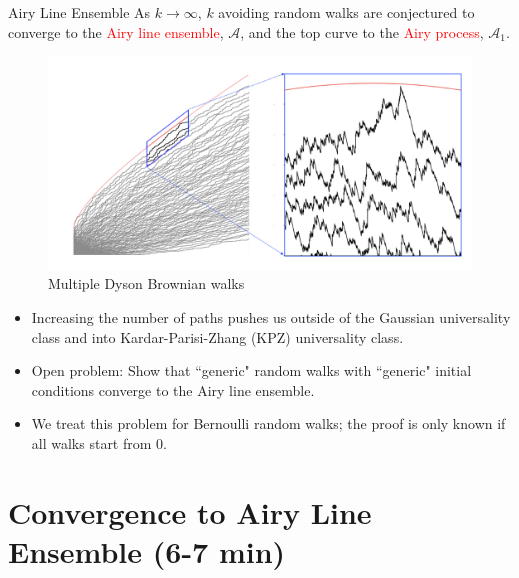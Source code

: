 \documentclass[9pt,t,dvipsnames]{beamer}
\begin{document}
\begin{frame}{Airy Line Ensemble}
As $k \to \infty$, $k$ avoiding random walks are conjectured to converge to the \textcolor{red}{Airy line ensemble}, $\mathcal{A}$, and the top curve to the \textcolor{red}{Airy process}, $\mathcal{A}_1$.
\begin{figure}
	\includegraphics[height=0.25\textheight]{graphics/airy.png}
	\caption{Multiple Dyson Brownian walks}
\end{figure}

\begin{itemize}
	
	\item Increasing the number of paths pushes us outside of the Gaussian universality class and into Kardar-Parisi-Zhang (KPZ) universality class.
	
	\item Open problem: Show that ``generic" random walks with ``generic" initial conditions converge to the Airy line ensemble. 
	
	\item We treat this problem for Bernoulli random walks; the proof is only known if all walks start from 0.
	
\end{itemize}
\end{frame}


\section{Convergence to Airy Line Ensemble (6-7 min)}
\end{document}
